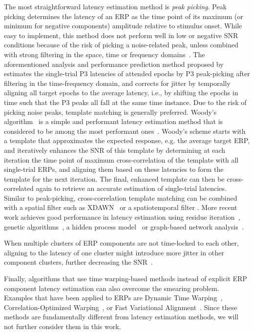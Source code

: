 The most straightforward latency estimation method is \textit{peak picking}.
Peak picking determines the latency of an ERP as the time point of its maximum
(or minimum for negative components) amplitude relative to stimulus
onset.
While easy to implement, this method does not perform well in low or negative
SNR conditions because of the risk of picking a noise-related peak, unless
combined with strong filtering in the space, time or frequency
domains~\cite{Avanzo2011,Arico2014,TREDER2016279,Ouyang2017}.
The aforementioned analysis and performance prediction method proposed
by \cite{Arico2014} estimates the single-trial P3 latencies of attended
epochs by P3 peak-picking after filtering in the time-frequency domain, and
corrects for jitter by temporally aligning all target epochs to the average
latency, i.e., by shifting the epochs in time such that the P3 peaks all fall
at the same time instance.
Due to the risk of picking noise peaks, template matching is generally
preferred.
Woody's algorithm~\cite{woody1967characterization} is a simple and performant
latency estimation method that is considered to be among
the most performant ones~\cite{Ouyang2017}.
Woody's scheme starts with a template that approximates the expected response,
e.g. the average target ERP, and iteratively enhances the SNR of this template by determining at
each iteration the time point of maximum cross-correlation of the template
with all single-trial ERPs, and aligning them based on these latencies to form
the template for the next iteration.
The final, enhanced template can then be cross-correlated again to retrieve an
accurate estimation of single-trial latencies.
Similar to peak-picking, cross-correlation template matching can be combined
with a spatial filter such as XDAWN~\cite{souloumiac2013improved} or a
spatiotemporal filter \cite{Iturrate2014}.
More recent work achieves good performance in latency estimation using residue
iteration~\cite{Ouyang2017}, genetic
algorithms~\cite{Pelo2018}, a hidden process model~\cite{Kim2020} or
graph-based network analysis~\cite{Dimitriadis2018}.

When multiple clusters of ERP components are not time-locked to
each other, aligning to the latency of one cluster might introduce more jitter
in other component clusters, further decreasing the SNR~\cite{Ouyang2020}.


Finally, algorithms that use time
warping-based methods instead of explicit ERP component latency estimation can
also overcome the smearing problem.
Examples that have been applied to ERPs are Dynamic Time
Warping~\cite{Casarotto2005,486255,wang2001warp,Zoumpoulaki2015},
Correlation-Optimized Warping~\cite{Skov2006}, or Fast Variational
Alignment~\cite{Flotho2021}. Since these methods are fundamentally
different from latency estimation methods,
we will not further consider them in this work.


